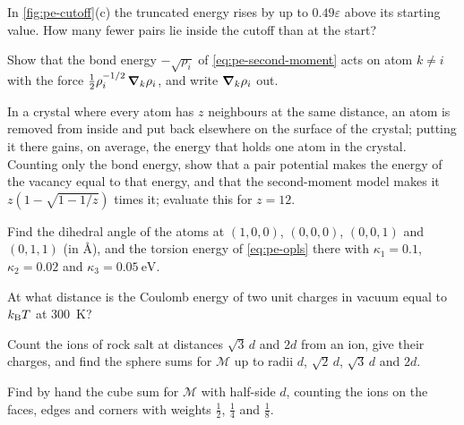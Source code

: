 \begin{exercise}
\label{ex:pe-crossings}
In \cref{fig:pe-cutoff}(c) the truncated energy rises by up to
$0.49\varepsilon$ above its starting value. How many fewer pairs lie
inside the cutoff than at the start?
\end{exercise}

\begin{exercise}
\label{ex:pe-sqrt-force}
Show that the bond energy $-\sqrt{\rho_i}$ of \cref{eq:pe-second-moment}
acts on atom $k \ne i$ with the force $\frac12\rho_i^{-1/2}\,\bm{\nabla}_k
\rho_i$, and write $\bm{\nabla}_k\rho_i$ out.
\end{exercise}

\begin{exercise}[a vacancy]
\label{ex:pe-vacancy}
In a crystal where every atom has $z$ neighbours at the same distance,
an atom is removed from inside and put back elsewhere on the surface of
the crystal; putting it there gains, on average, the energy that holds
one atom in the crystal.
Counting only the bond energy, show that a pair potential makes the
energy of the vacancy equal to that energy, and that the second-moment
model makes it $z(1 - \sqrt{1 - 1/z})$ times it; evaluate this for $z =
12$.
\end{exercise}

\begin{exercise}
\label{ex:pe-dihedral}
Find the dihedral angle of the atoms at $(1, 0, 0)$, $(0, 0, 0)$, $(0, 0,
1)$ and $(0, 1, 1)$ (in \AA), and the torsion energy of
\cref{eq:pe-opls} there with $\kappa_1 = 0.1$, $\kappa_2 = 0.02$ and
$\kappa_3 = \SI{0.05}{\electronvolt}$.
\end{exercise}

\begin{exercise}
\label{ex:pe-bjerrum}
At what distance is the Coulomb energy of two unit charges in vacuum
equal to $k_{\mathrm{B}} T$ at \SI{300}{\kelvin}?
\end{exercise}

\begin{exercise}
\label{ex:pe-shells}
Count the ions of rock salt at distances $\sqrt3\,d$ and $2d$ from an ion,
give their charges, and find the sphere sums for $\mathcal{M}$ up to radii $d$,
$\sqrt2\,d$, $\sqrt3\,d$ and $2d$.
\end{exercise}

\begin{exercise}
\label{ex:pe-cube}
Find by hand the cube sum for $\mathcal{M}$ with half-side $d$, counting the ions on
the faces, edges and corners with weights $\frac12$, $\frac14$ and
$\frac18$.
\end{exercise}
